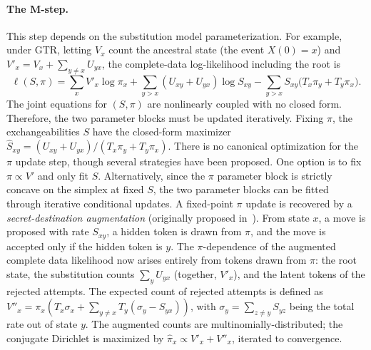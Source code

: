 \documentclass[11pt]{article}
\begin{document}
\paragraph{The M-step.} This step depends on the substitution model parameterization.
For example, under GTR, letting $V_x$ count the ancestral state
(the event $X(0)=x$) and $V'_x=V_x+\sum_{y\ne x}U_{yx}$, the
complete-data log-likelihood including the root is
\begin{equation}
\label{eq:ell2}
\ell(S,\pi)=\sum_x V'_x\log\pi_x+\sum_{y>x}(U_{xy}{+}U_{yx})\log S_{xy}
 -\sum_{y>x}S_{xy}\big(T_x\pi_y+T_y\pi_x\big).
\end{equation}
The joint equations for $(S,\pi)$ are nonlinearly coupled with no closed form.
Therefore, the two parameter blocks must be updated iteratively.
Fixing $\pi$, the exchangeabilities $S$ have the closed-form maximizer
$\widehat S_{xy}=(U_{xy}{+}U_{yx})/(T_x\pi_y+T_y\pi_x)$.
There is no canonical optimization for the $\pi$ update step, though several strategies have been proposed.
One option is to fix $\pi\propto V'$ and only fit $S$.
Alternatively, since the $\pi$ parameter block is strictly concave on the simplex at fixed $S$, the two parameter blocks can be fitted through iterative conditional updates.
A fixed-point $\pi$ update is recovered by a \emph{secret-destination augmentation} (originally proposed in~\citet{Bruno1996}).
From state $x$, a move is proposed with rate $S_{xy}$, a hidden token is drawn from $\pi$, and the move is accepted only if the hidden token is $y$.
The $\pi$-dependence of the augmented complete data likelihood now arises entirely from tokens drawn from $\pi$:
the root state, the substitution counts $\sum_{y}U_{yx}$ (together, $V'_x$), and the latent tokens of the rejected attempts.
The expected count of rejected attempts is defined as $V''_x = \pi_x( T_x \sigma_x + \sum_{y\ne x} T_y(\sigma_y-S_{yx}) )$, with $\sigma_y=\sum_{z\ne y}S_{yz}$ being the total rate out of state $y$.
The augmented counts are multinomially-distributed; the conjugate Dirichlet is maximized by $\widehat\pi_x\propto V'_x+V''_x$,
iterated to convergence.


\end{document}
